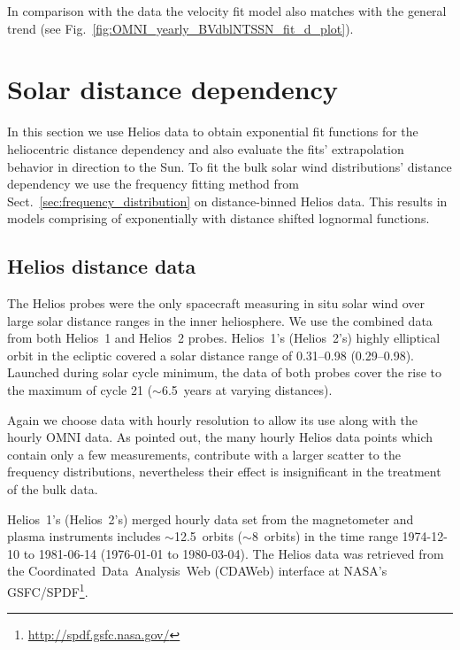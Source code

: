 In comparison with the data the velocity fit model also matches with the general trend (see Fig.~\ref{fig:OMNI_yearly_BVdblNTSSN_fit_d_plot}).\\


\section{Solar distance dependency}
\label{sec:solar_distance_dependency}
In this section we use Helios data to obtain exponential fit functions for the heliocentric distance dependency and also evaluate the fits' extrapolation behavior in direction to the Sun. To fit the bulk solar wind distributions' distance dependency we use the frequency fitting method from Sect.~\ref{sec:frequency_distribution} on distance-binned Helios data. This results in models comprising of exponentially with distance shifted lognormal functions.

\subsection{Helios distance data}
\label{sec:helios_distance_data}
The Helios probes were the only spacecraft measuring in situ solar wind over large solar distance ranges in the inner heliosphere. We use the combined data from both Helios~1 and Helios~2 probes. Helios~1's (Helios~2's) highly elliptical orbit in the ecliptic covered a solar distance range of \SIrange{0.31}{0.98}{\au} (\SIrange{0.29}{0.98}{\au}). Launched during solar cycle minimum, the data of both probes cover the rise to the maximum of cycle 21 ($\sim$6.5~years at varying distances).

Again we choose data with hourly resolution to allow its use along with the hourly OMNI data. As \citet{Schwenn1983} pointed out, the many hourly Helios data points which contain only a few measurements, contribute with a larger scatter to the frequency distributions, nevertheless their effect is insignificant in the treatment of the bulk data.	%

Helios~1's (Helios~2's) merged hourly data set from the magnetometer and plasma instruments \citep{Rosenbauer1977} includes $\sim$12.5~orbits ($\sim$8~orbits) in the time range \mbox{1974-12-10} to \mbox{1981-06-14} (\mbox{1976-01-01} to \mbox{1980-03-04}).
The Helios data was retrieved from the Coordinated~Data~Analysis~Web (CDAWeb) interface at NASA's GSFC/SPDF\footnote{\url{http://spdf.gsfc.nasa.gov/}}.

